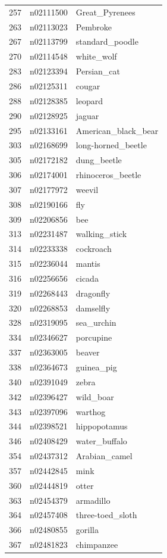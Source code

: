 \begin{table}
\begin{tabular}{cll}
257 & n02111500 & Great_Pyrenees \\
263 & n02113023 & Pembroke \\
267 & n02113799 & standard_poodle \\
270 & n02114548 & white_wolf \\
283 & n02123394 & Persian_cat \\
286 & n02125311 & cougar \\
288 & n02128385 & leopard \\
290 & n02128925 & jaguar \\
295 & n02133161 & American_black_bear \\
303 & n02168699 & long-horned_beetle \\
305 & n02172182 & dung_beetle \\
306 & n02174001 & rhinoceros_beetle \\
307 & n02177972 & weevil \\
308 & n02190166 & fly \\
309 & n02206856 & bee \\
313 & n02231487 & walking_stick \\
314 & n02233338 & cockroach \\
315 & n02236044 & mantis \\
316 & n02256656 & cicada \\
319 & n02268443 & dragonfly \\
320 & n02268853 & damselfly \\
328 & n02319095 & sea_urchin \\
334 & n02346627 & porcupine \\
337 & n02363005 & beaver \\
338 & n02364673 & guinea_pig \\
340 & n02391049 & zebra \\
342 & n02396427 & wild_boar \\
343 & n02397096 & warthog \\
344 & n02398521 & hippopotamus \\
346 & n02408429 & water_buffalo \\
354 & n02437312 & Arabian_camel \\
357 & n02442845 & mink \\
360 & n02444819 & otter \\
363 & n02454379 & armadillo \\
364 & n02457408 & three-toed_sloth \\
366 & n02480855 & gorilla \\
367 & n02481823 & chimpanzee \\

\end{tabular}
\end{table}
